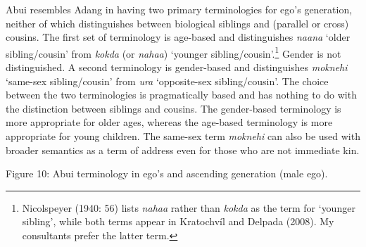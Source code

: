 \hypertarget{RefHeading78027871885726}{}Abui resembles Adang in having two primary terminologies for ego{\textquoteright}s generation, neither of which distinguishes between biological siblings and (parallel or cross) cousins. The first set of terminology is age-based and distinguishes \textit{naana }{\textquoteleft}older sibling/cousin{\textquoteright} from \textit{kokda }(or \textit{nahaa}) {\textquoteleft}younger sibling/cousin{\textquoteright}.\footnote{ Nicolspeyer (1940: 56) lists \textit{nahaa }rather than \textit{kokda }as the term for {\textquoteleft}younger sibling{\textquoteright}, while both terms appear in Kratochv\'il and Delpada (2008). My consultants prefer the latter term. } Gender is not distinguished. A second terminology is gender-based and distinguishes \textit{moknehi }{\textquoteleft}same-sex sibling/cousin{\textquoteright} from \textit{ura }{\textquoteleft}opposite-sex sibling/cousin{\textquoteright}. The choice between the two terminologies is pragmatically based and has nothing to 
do with the distinction between siblings and cousins. The gender-based terminology is more appropriate for older ages, whereas the age-based terminology is more appropriate for young children. The same-sex term \textit{moknehi }can also be used with broader semantics as a term of address even for those who are not immediate kin.

{\centering
Figure 10: Abui terminology in ego{\textquoteright}s and ascending generation (male ego). 
\par}

{%
 \par}


